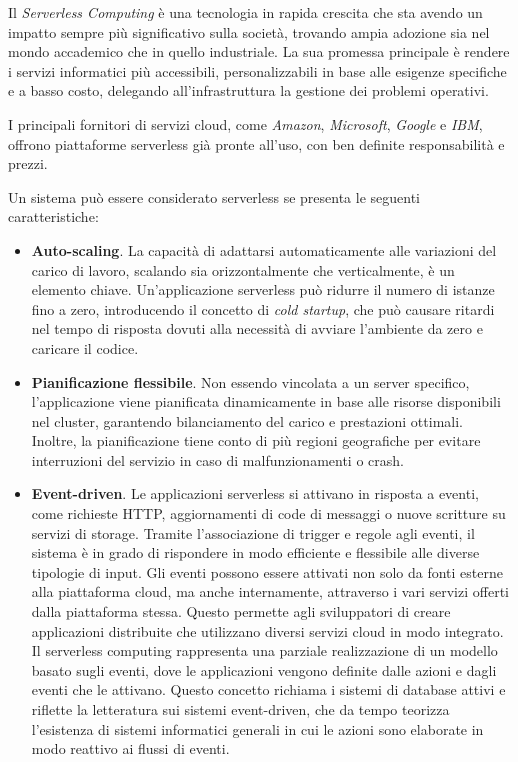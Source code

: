 Il \textit{Serverless Computing} è una tecnologia in rapida crescita che sta avendo un impatto sempre più significativo sulla società, trovando ampia adozione sia nel mondo accademico che in quello industriale. La sua promessa principale è rendere i servizi informatici più accessibili, personalizzabili in base alle esigenze specifiche e a basso costo, delegando all'infrastruttura la gestione dei problemi operativi.

I principali fornitori di servizi cloud, come \textit{Amazon}, \textit{Microsoft}, \textit{Google} e \textit{IBM}, offrono piattaforme serverless già pronte all'uso, con ben definite responsabilità e prezzi.

Un sistema può essere considerato serverless se presenta le seguenti caratteristiche\cite{7979855}:
\begin{itemize}
    \item \textbf{Auto-scaling}. La capacità di adattarsi automaticamente alle variazioni del carico di lavoro, scalando sia orizzontalmente che verticalmente, è un elemento chiave. Un'applicazione serverless può ridurre il numero di istanze fino a zero, introducendo il concetto di \textit{cold startup}, che può causare ritardi nel tempo di risposta dovuti alla necessità di avviare l'ambiente da zero e caricare il codice.
    \item \textbf{Pianificazione flessibile}. Non essendo vincolata a un server specifico, l'applicazione viene pianificata dinamicamente in base alle risorse disponibili nel cluster, garantendo bilanciamento del carico e prestazioni ottimali. Inoltre, la pianificazione tiene conto di più regioni geografiche per evitare interruzioni del servizio in caso di malfunzionamenti o crash.
    \item \textbf{Event-driven}. Le applicazioni serverless si attivano in risposta a eventi, come richieste HTTP, aggiornamenti di code di messaggi o nuove scritture su servizi di storage. Tramite l'associazione di trigger e regole agli eventi, il sistema è in grado di rispondere in modo efficiente e flessibile alle diverse tipologie di input. Gli eventi possono essere attivati non solo da fonti esterne alla piattaforma cloud, ma anche internamente, attraverso i vari servizi offerti dalla piattaforma stessa. Questo permette agli sviluppatori di creare applicazioni distribuite che utilizzano diversi servizi cloud in modo integrato. Il serverless computing rappresenta una parziale realizzazione di un modello basato sugli eventi, dove le applicazioni vengono definite dalle azioni e dagli eventi che le attivano. Questo concetto richiama i sistemi di database attivi e riflette la letteratura sui sistemi event-driven, che da tempo teorizza l'esistenza di sistemi informatici generali in cui le azioni sono elaborate in modo reattivo ai flussi di eventi.
    

\end{itemize}
